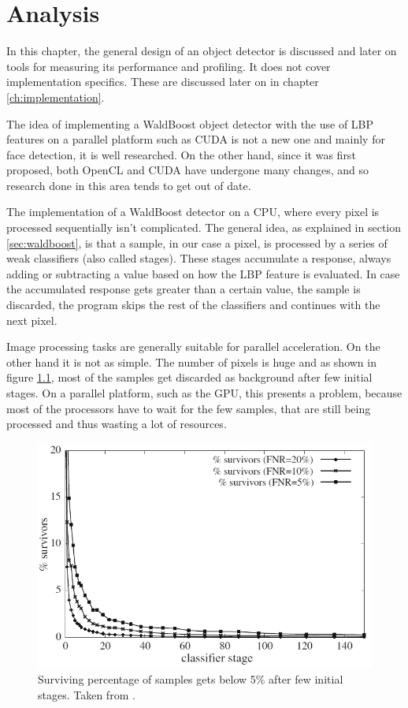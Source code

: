 \chapter{Analysis}\label{ch:analysis}

In this chapter, the general design of an object detector is discussed and later on tools for measuring its performance and profiling. It does not cover implementation specifics. These are discussed later on in chapter \ref{ch:implementation}.

The idea of implementing a WaldBoost object detector with the use of LBP features on a parallel platform such as CUDA is not a new one and mainly for face detection, it is well researched. On the other hand, since it was first proposed, both OpenCL and CUDA have undergone many changes, and so research done in this area tends to get out of date.

The implementation of a WaldBoost detector on a CPU, where every pixel is processed sequentially isn't complicated. The general idea, as explained in section \ref{sec:waldboost}, is that a sample, in our case a pixel, is processed by a series of weak classifiers (also called stages). These stages accumulate a response, always adding or subtracting a value based on how the LBP feature is evaluated. In case the accumulated response gets greater than a certain value, the sample is discarded, the program skips the rest of the classifiers and continues with the next pixel.

Image processing tasks are generally suitable for parallel acceleration. On the other hand it is not as simple. The number of pixels is huge and as shown in figure \ref{fig:survivors}, most of the samples get discarded as background after few initial stages. On a parallel platform, such as the GPU, this presents a problem, because most of the processors have to wait for the few samples, that are still being processed and thus wasting a lot of resources.

\begin{center}
\begin{figure}[ht]
	\centering\includegraphics[width=0.50\linewidth]{fig/survivors.png}
	\caption{Surviving percentage of samples gets below 5\% after few initial stages. Taken from \cite{herout2011real}.}
	\label{fig:survivors}
\end{figure}
\end{center}

